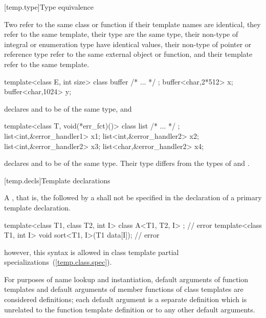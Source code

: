 [temp.type]{Type equivalence}

\pnum
{}%
Two  refer to the same class or function if
their template names are identical, they refer to the same template,
their type  are the same type,
their non-type  of
integral or enumeration type have identical values,
their non-type  of
pointer or reference type refer to the same external object or function, and
their template  refer
to the same template.
\enterexample

\begin{codeblock}
template<class E, int size> class buffer { /* ... */ };
buffer<char,2*512> x;
buffer<char,1024> y;
\end{codeblock}

declares
and
to be of the same type, and

\begin{codeblock}
template<class T, void(*err_fct)()> class list { /* ... */ };
list<int,&error_handler1> x1;
list<int,&error_handler2> x2;
list<int,&error_handler2> x3;
list<char,&error_handler2> x4;
\end{codeblock}

declares
and
to be of the same type.
Their type differs from the types of
and
.
\exitexample

[temp.decls]{Template declarations}

\pnum
A
,
that is, the
followed by a
shall not be specified in the declaration of a primary template declaration.
\enterexample

\begin{codeblock}
template<class T1, class T2, int I> class A<T1, T2, I> { };     // error
template<class T1, int I> void sort<T1, I>(T1 data[I]);         // error
\end{codeblock}
\exitexampleb
\enternote
however, this syntax is allowed in class template partial specializations~(\ref{temp.class.spec}).
\exitnote

\pnum
For purposes of name lookup and instantiation,
default arguments of function templates and default arguments of
member functions of class templates are considered definitions;
each default argument is a separate definition which is unrelated to
the function template definition or to any other default arguments.

